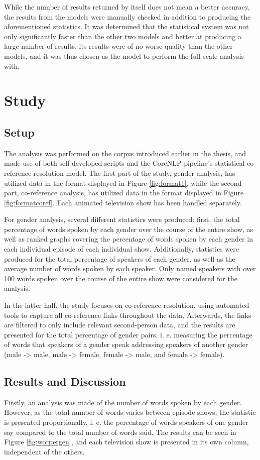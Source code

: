 \documentclass[a4paper, 11pt]{article}
\begin{document}
While the number of results returned by itself does not mean a better accuracy, the results from the models were manually checked in addition to producing the aforementioned statistics. It was determined that the statistical system was not only significantly faster than the other two models and better at producing a large number of results, its results were of no worse quality than the other models, and it was thus chosen as the model to perform the full-scale analysis with.

\section{Study}

\subsection{Setup}
The analysis was performed on the corpus introduced earlier in the thesis, and made use of both self-developed scripts and the CoreNLP pipeline's statistical co-reference resolution model. The first part of the study, gender analysis, has utilized data in the format displayed in Figure \ref{fig:format1}, while the second part, co-reference analysis, has utilized data in the format displayed in Figure \ref{fig:formatcoref}. Each animated television show has been handled separately.

For gender analysis, several different statistics were produced: first, the total percentage of words spoken by each gender over the course of the entire show, as well as ranked graphs covering the percentage of words spoken by each gender in each individual episode of each individual show. Additionally, statistics were produced for the total percentage of speakers of each gender, as well as the average number of words spoken by each speaker. Only named speakers with over 100 words spoken over the course of the entire show were considered for the analysis.

In the latter half, the study focuses on co-reference resolution, using automated tools to capture all co-reference links throughout the data. Afterwards, the links are filtered to only include relevant second-person data, and the results are presented for the total percentage of gender pairs, i. e. measuring the percentage of words that speakers of a gender speak addressing speakers of another gender (male -> male, male -> female, female -> male, and female -> female).

\subsection{Results and Discussion}
Firstly, an analysis was made of the number of words spoken by each gender. However, as the total number of words varies between episode shows, the statistic is presented proportionally, i. e. the percentage of words speakers of one gender say compared to the total number of words said. The results can be seen in Figure \ref{fig:worpergen}, and each television show is presented in its own column, independent of the others.
\end{document}
